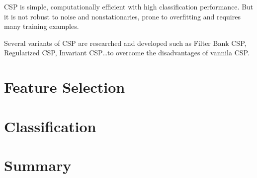 CSP is simple, computationally efficient with high classification performance. But it is not robust to noise and nonstationaries, prone to overfitting and requires
many training examples.

Several variants of CSP are researched and developed such as Filter Bank CSP, Regularized CSP, Invariant CSP\dots to overcome the disadvantages of vannila CSP.

\section{Feature Selection} 

\section{Classification}

\section*{Summary}